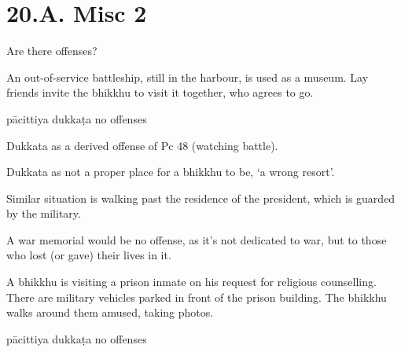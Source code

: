 \chapter{20.A. Misc 2}
\renewcommand*{\theChapterTitle}{20.A. Misc 2}

\begin{exam}{\autoExamName}

  \begin{problem*}

    Are there offenses?

    \begin{parts}

      \item An out-of-service battleship, still in the harbour, is used as a museum. Lay
      friends invite the bhikkhu to visit it together, who agrees to go.

      \bigskip

      \begin{answers}{3}
        \bChoices
         pācittiya\eAns
         dukkaṭa\eAns
         no offenses\eAns
        \eChoices
      \end{answers}

      \begin{solution}
        Dukkata as a derived offense of Pc 48 (watching battle).

        Dukkata as not a proper place for a bhikkhu to be, `a wrong resort'.

        Similar situation is walking past the residence of the president, which is guarded by the military.

        A war memorial would be no offense, as it's not dedicated to war, but to those who lost (or gave) their lives in it.
      \end{solution}

      \bigskip

      \item A bhikkhu is visiting a prison inmate on his request for religious
      counselling. There are military vehicles parked in front of the prison
      building. The bhikkhu walks around them amused, taking photos.

      \bigskip

      \begin{answers}{3}
        \bChoices
         pācittiya\eAns
         dukkaṭa\eAns
         no offenses\eAns
        \eChoices
      \end{answers}


\end{parts}
\end{problem*}
\end{exam}
